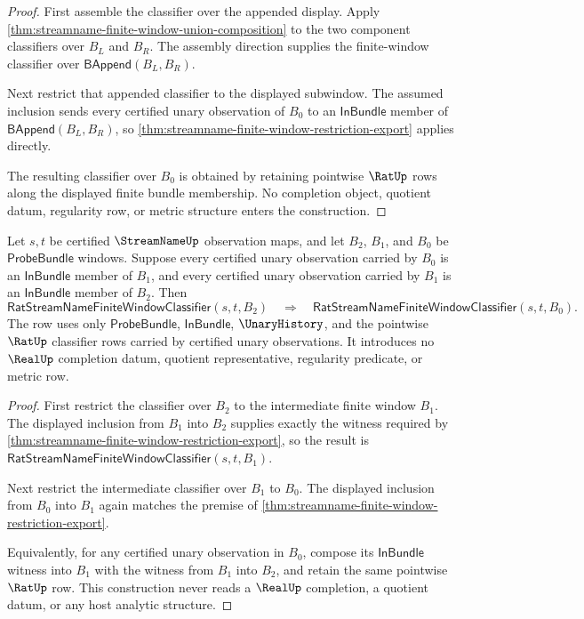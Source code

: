 \begin{proof}
First assemble the classifier over the appended display. Apply
\autoref{thm:streamname-finite-window-union-composition} to the two component
classifiers over $B_L$ and $B_R$. The assembly direction supplies the
finite-window classifier over $\mathsf{BAppend}(B_L,B_R)$.

Next restrict that appended classifier to the displayed subwindow. The
assumed inclusion sends every certified unary observation of $B_0$ to an
$\mathsf{InBundle}$ member of $\mathsf{BAppend}(B_L,B_R)$, so
\autoref{thm:streamname-finite-window-restriction-export} applies directly.

The resulting classifier over $B_0$ is obtained by retaining pointwise
$\RatUp$ rows along the displayed finite bundle membership. No completion
object, quotient datum, regularity row, or metric structure enters the
construction.
\end{proof}

\begin{theorem}
\label{thm:streamname-finite-window-refinement-transitivity}
Let $s,t$ be certified $\StreamNameUp$ observation maps, and let $B_2$,
$B_1$, and $B_0$ be $\mathsf{ProbeBundle}$ windows. Suppose every certified
unary observation carried by $B_0$ is an $\mathsf{InBundle}$ member of
$B_1$, and every certified unary observation carried by $B_1$ is an
$\mathsf{InBundle}$ member of $B_2$. Then
$$
\mathsf{RatStreamNameFiniteWindowClassifier}(s,t,B_2)
\quad\Longrightarrow\quad
\mathsf{RatStreamNameFiniteWindowClassifier}(s,t,B_0).
$$
The row uses only $\mathsf{ProbeBundle}$, $\mathsf{InBundle}$,
$\UnaryHistory$, and the pointwise $\RatUp$ classifier rows carried by
certified unary observations. It introduces no $\RealUp$ completion datum,
quotient representative, regularity predicate, or metric row.
\end{theorem}

\begin{proof}
First restrict the classifier over $B_2$ to the intermediate finite window
$B_1$. The displayed inclusion from $B_1$ into $B_2$ supplies exactly the
witness required by
\autoref{thm:streamname-finite-window-restriction-export}, so the result is
$\mathsf{RatStreamNameFiniteWindowClassifier}(s,t,B_1)$.

Next restrict the intermediate classifier over $B_1$ to $B_0$. The displayed
inclusion from $B_0$ into $B_1$ again matches the premise of
\autoref{thm:streamname-finite-window-restriction-export}.

Equivalently, for any certified unary observation in $B_0$, compose its
$\mathsf{InBundle}$ witness into $B_1$ with the witness from $B_1$ into
$B_2$, and retain the same pointwise $\RatUp$ row. This construction never
reads a $\RealUp$ completion, a quotient datum, or any host analytic
structure.
\end{proof}


